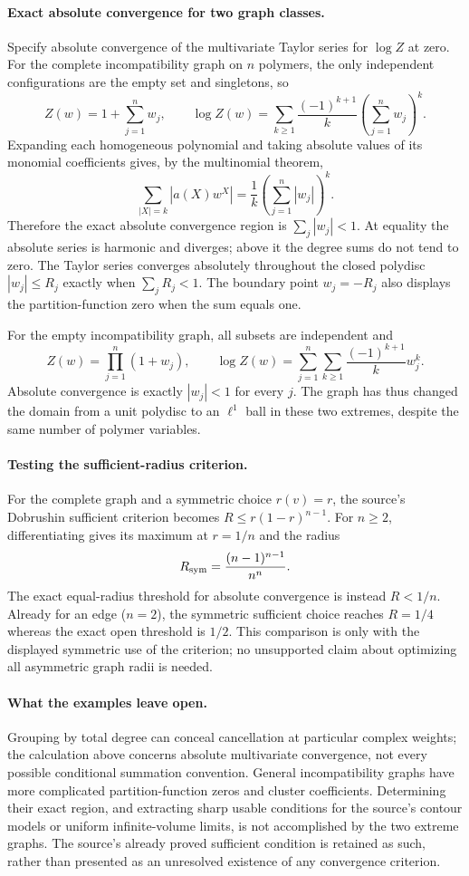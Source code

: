 \documentclass[11pt]{article}
\begin{document}
\paragraph{Exact absolute convergence for two graph classes.}
Specify absolute convergence of the multivariate Taylor series for $\log Z$ at zero. For the complete incompatibility graph on $n$ polymers, the only independent configurations are the empty set and singletons, so
\[
 Z(w)=1+\sum_{j=1}^n w_j,\qquad
 \log Z(w)=\sum_{k\geq1}\frac{(-1)^{k+1}}k
                   \left(\sum_{j=1}^n w_j\right)^k.
\]
Expanding each homogeneous polynomial and taking absolute values of its monomial coefficients gives, by the multinomial theorem,
\[
 \sum_{|X|=k}|a(X)w^X|=\frac1k\left(\sum_{j=1}^n|w_j|\right)^k.
\]
Therefore the exact absolute convergence region is $\sum_j|w_j|<1$. At equality the absolute series is harmonic and diverges; above it the degree sums do not tend to zero. The Taylor series converges absolutely throughout the closed polydisc $|w_j|\leq R_j$ exactly when $\sum_jR_j<1$. The boundary point $w_j=-R_j$ also displays the partition-function zero when the sum equals one.

For the empty incompatibility graph, all subsets are independent and
\[
 Z(w)=\prod_{j=1}^n(1+w_j),\qquad
 \log Z(w)=\sum_{j=1}^n\sum_{k\geq1}
                 \frac{(-1)^{k+1}}k w_j^k.
\]
Absolute convergence is exactly $|w_j|<1$ for every $j$. The graph has thus changed the domain from a unit polydisc to an $\ell^1$ ball in these two extremes, despite the same number of polymer variables.

\paragraph{Testing the sufficient-radius criterion.}
For the complete graph and a symmetric choice $r(v)=r$, the source's Dobrushin sufficient criterion becomes
$R\leq r(1-r)^{n-1}$.
For $n\geq2$, differentiating gives its maximum at $r=1/n$ and the radius
\[
 R_{\rm sym}=\frac{(n-1)^{n-1}}{n^n}.
\]
The exact equal-radius threshold for absolute convergence is instead $R<1/n$. Already for an edge ($n=2$), the symmetric sufficient choice reaches $R=1/4$ whereas the exact open threshold is $1/2$. This comparison is only with the displayed symmetric use of the criterion; no unsupported claim about optimizing all asymmetric graph radii is needed.

\paragraph{What the examples leave open.}
Grouping by total degree can conceal cancellation at particular complex weights; the calculation above concerns absolute multivariate convergence, not every possible conditional summation convention. General incompatibility graphs have more complicated partition-function zeros and cluster coefficients. Determining their exact region, and extracting sharp usable conditions for the source's contour models or uniform infinite-volume limits, is not accomplished by the two extreme graphs. The source's already proved sufficient condition is retained as such, rather than presented as an unresolved existence of any convergence criterion.
\end{document}
